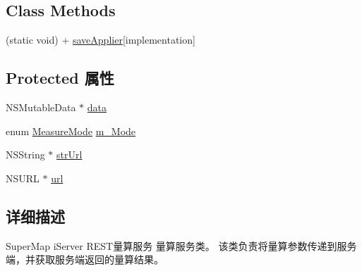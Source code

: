\subsection*{Class Methods}
\begin{DoxyCompactItemize}
\item 
(static void) + \hyperlink{interface_r_m_s_m_measure_service_a3a86de7cdf5b3814f6762f782a7e1ae4}{save\-Applier}{\ttfamily  \mbox{[}implementation\mbox{]}}
\end{DoxyCompactItemize}
\subsection*{Protected 属性}
\begin{DoxyCompactItemize}
\item 
N\-S\-Mutable\-Data $\ast$ \hyperlink{interface_r_m_s_m_measure_service_a3aae027c2610d827726c919e9650cec0}{data}
\item 
enum \hyperlink{_r_m_global_constants_8h_a344cf3c6242115d67b7371e501a921f2}{Measure\-Mode} \hyperlink{interface_r_m_s_m_measure_service_ab04420fd34904023a05ac939a3e3df17}{m\-\_\-\-Mode}
\item 
N\-S\-String $\ast$ \hyperlink{interface_r_m_s_m_measure_service_a1fc5b2265daee2f7198461d6cca268b9}{str\-Url}
\item 
N\-S\-U\-R\-L $\ast$ \hyperlink{interface_r_m_s_m_measure_service_a2b5b549e267bbddab147b5b7193be2df}{url}
\end{DoxyCompactItemize}


\subsection{详细描述}
Super\-Map i\-Server R\-E\-S\-T量算服务 量算服务类。 该类负责将量算参数传递到服务端，并获取服务端返回的量算结果。 



